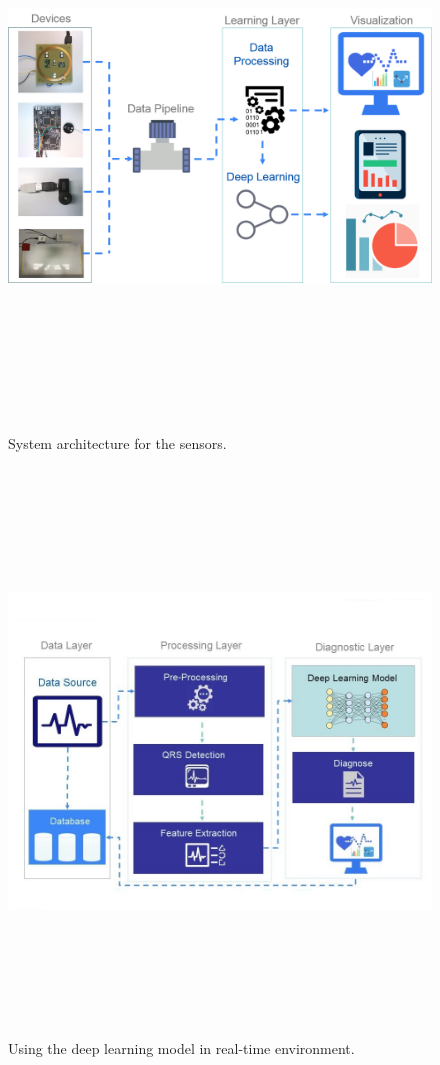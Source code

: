 \begin{figure}[htpb]
	\centering
	\includegraphics[width=16cm,height=15cm,keepaspectratio=true]{images/sys_arc}
	\caption{
		System architecture for the sensors.
	}
	\label{fig:sys_arc}
\end{figure}


\begin{figure}[htpb]
	\centering
	\includegraphics[width=16cm,height=15cm,keepaspectratio=true]{images/using_ann}
	\caption{
		Using the deep learning model in real-time environment.
	}
	\label{fig:using_ann}
\end{figure}


